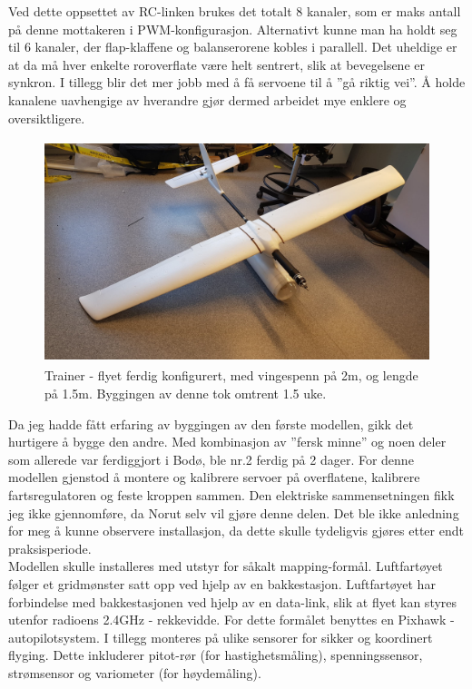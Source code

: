 \documentclass[12pt, a4paper]{report}
\begin{document}
Ved dette oppsettet av RC-linken brukes det totalt 8 kanaler, som er maks antall på denne mottakeren i PWM-konfigurasjon. Alternativt kunne man ha holdt seg til 6 kanaler, der flap-klaffene og balanserorene kobles i parallell. Det uheldige er at da må hver enkelte roroverflate være helt sentrert, slik at bevegelsene er synkron. I tillegg blir det mer jobb med å få servoene til å ''gå riktig vei''. Å holde kanalene uavhengige av hverandre gjør dermed arbeidet mye enklere og oversiktligere. 

\begin{figure}[ht]
	\centering
	\includegraphics[width=.6\textwidth, height = 6.5cm]{bilder/forste_fly_ferdigstilt.jpg}
	\caption{Trainer - flyet ferdig konfigurert, med vingespenn på 2m, og lengde på 1.5m. Byggingen av denne tok omtrent 1.5 uke. }
\end{figure}

Da jeg hadde fått erfaring av byggingen av den første modellen, gikk det hurtigere å bygge den andre. Med kombinasjon av ''fersk minne'' og noen deler som allerede var ferdiggjort i Bodø, ble nr.2 ferdig på 2 dager. For denne modellen gjenstod å montere og kalibrere servoer på overflatene, kalibrere fartsregulatoren og feste kroppen sammen. Den elektriske sammensetningen fikk jeg ikke gjennomføre, da Norut selv vil gjøre denne delen. Det ble ikke anledning for meg å kunne observere installasjon, da dette skulle tydeligvis gjøres etter endt praksisperiode. \\
Modellen skulle installeres med utstyr for såkalt mapping-formål. Luftfartøyet følger et gridmønster satt opp ved hjelp av en bakkestasjon. Luftfartøyet har forbindelse med bakkestasjonen ved hjelp av en data-link, slik at flyet kan styres utenfor radioens 2.4GHz - rekkevidde. For dette formålet benyttes en Pixhawk - autopilotsystem. I tillegg monteres på ulike sensorer for sikker og koordinert flyging. Dette inkluderer pitot-rør (for hastighetsmåling), spenningssensor, strømsensor og variometer (for høydemåling). 
\end{document}
